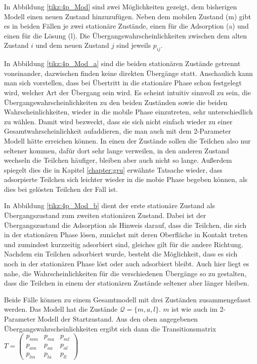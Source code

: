 In Abbildung \ref{tikz:4p_Mod} sind zwei Möglichkeiten gezeigt, dem bisherigen Modell einen neuen Zustand hinzuzufügen.
Neben dem mobilen Zustand (m) gibt es in beiden Fällen je zwei stationäre Zustände, einen für die Adsorption (a) und einen für die Lösung (l). Die Übergangswahrscheinlichkeiten zwischen dem alten Zustand $i$ und dem neuen Zustand $j$ sind jeweils $p_{ij}$. 

In Abbildung \ref{tikz:4p_Mod_a} sind die beiden stationären Zustände getrennt voneinander, dazwischen finden keine direkten Übergänge statt. 
Anschaulich kann man sich vorstellen, dass bei Übertritt in die stationäre Phase schon festgelegt wird, welcher Art der Übergang sein wird. Es scheint intuitiv sinnvoll zu sein, die Übergangswahrscheinlichkeiten zu den beiden Zuständen sowie die beiden Wahrscheinlichkeiten, wieder in die mobile Phase einzutreten, sehr unterschiedlich zu wählen. Damit wird bezweckt, dass sie sich nicht einfach wieder zu einer Gesamtwahrscheinlichkeit aufaddieren, die man auch mit dem 2-Parameter Modell hätte erreichen können. In einen der Zustände sollen die Teilchen also nur seltener kommen, dafür dort sehr lange verweilen,  in den anderen Zustand wechseln die Teilchen häufiger, bleiben aber auch nicht so lange. Außerdem spiegelt dies die in Kapitel \ref{chapter:gru} erwähnte Tatsache wieder, dass adsorpierte Teilchen sich leichter wieder in die mobie Phase begeben können, als dies bei gelösten Teilchen der Fall ist.

In Abbildung \ref{tikz:4p_Mod_b} dient der erste stationäre Zustand als Übergangszustand zum zweiten stationären Zustand. Dabei ist der Übergangszustand die Adsorption als Hinweis darauf, dass die Teilchen, die sich in der stationären Phase lösen, zunächst mit deren Oberfläche in Kontakt treten und zumindest kurzzeitig adsorbiert sind, gleiches gilt für die andere Richtung. Nachdem ein Teilchen adsorbiert wurde, besteht die Möglichkeit, dass es sich noch in der stationären Phase löst oder auch adsorbiert bleibt. Auch hier liegt es nahe, die Wahrscheinlichkeiten für die verschiedenen Übergänge so zu gestalten, dass die Teilchen in einem der stationären Zustände seltener aber länger bleiben.

Beide Fälle können zu einem Gesamtmodell mit drei Zuständen zusammengefasst werden. Das Modell hat die Zustände $\mathcal{Q} = \{m, a, l\}$. $m$ ist wie auch im 2-Parameter Modell der Startzustand. Aus den oben angegebenen Übergangswahrscheinlichkeiten ergibt sich dann die Transitionsmatrix 
$T= 
\begin{pmatrix}
p_{mm} &  p_{ma} & p_{ml} \\
p_{am} &  p_{aa} & p_{al} \\
p_{lm} &  p_{la} & p_{ll} 
\end{pmatrix}
$  

